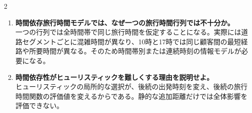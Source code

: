 \begin{multicols}{2}
\begin{enumerate}
\item \textbf{時間依存旅行時間モデルでは、なぜ一つの旅行時間行列では不十分か。}\\
一つの行列では全時間帯で同じ旅行時間を仮定することになる。実際には道路セグメントごとに混雑時間が異なり、10時と17時では同じ顧客間の最短経路や所要時間が異なる。そのため時間帯別または連続時刻の情報モデルが必要になる。
\item \textbf{時間依存性がヒューリスティックを難しくする理由を説明せよ。}\\
ヒューリスティックの局所的な選択が、後続の出発時刻を変え、後続の旅行時間関数の評価値を変えるからである。静的な追加距離だけでは全体影響を評価できない。
\end{enumerate}

\end{multicols}

\clearpage



\vspace{1.5mm}

